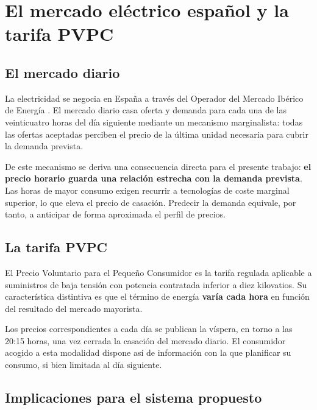 
\section{El mercado eléctrico español y la tarifa PVPC}

\subsection*{El mercado diario}

La electricidad se negocia en España a través del Operador del Mercado Ibérico de
Energía \parencite{omie}. El mercado diario casa oferta y demanda para cada una de
las veinticuatro horas del día siguiente mediante un mecanismo marginalista: todas
las ofertas aceptadas perciben el precio de la última unidad necesaria para cubrir
la demanda prevista.

De este mecanismo se deriva una consecuencia directa para el presente trabajo:
\textbf{el precio horario guarda una relación estrecha con la demanda prevista}.
Las horas de mayor consumo exigen recurrir a tecnologías de coste marginal
superior, lo que eleva el precio de casación. Predecir la demanda equivale, por
tanto, a anticipar de forma aproximada el perfil de precios.

\subsection*{La tarifa PVPC}

El Precio Voluntario para el Pequeño Consumidor es la tarifa regulada aplicable a
suministros de baja tensión con potencia contratada inferior a diez kilovatios.
Su característica distintiva es que el término de energía \textbf{varía cada hora}
en función del resultado del mercado mayorista.

Los precios correspondientes a cada día se publican la víspera, en torno a las
20:15 horas, una vez cerrada la casación del mercado diario. El consumidor acogido
a esta modalidad dispone así de información con la que planificar su consumo, si
bien limitada al día siguiente.

\subsection*{Implicaciones para el sistema propuesto}

